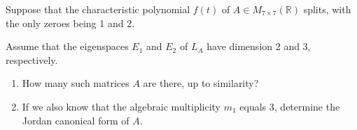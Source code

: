\documentclass[11pt]{scrartcl}
\begin{document}
\begin{problem*}
\hfill

Suppose that the characteristic polynomial $f(t)$ of
$A \in M_{7 \times 7}(\mathbb R)$ splits, with the only zeroes being 1 and 2. 

Assume that the eigenspaces $E_1$ and $E_2$ of $L_A$ have dimension 2 and 3, respectively.

\begin{enumerate}[label=\alph*)]
\item How many such matrices $A$ are there, up to similarity?
\item If we also know that the algebraic multiplicity $m_1$
equals 3, determine the Jordan canonical form of $A$.
\end{enumerate}
\end{problem*}
\end{document}

